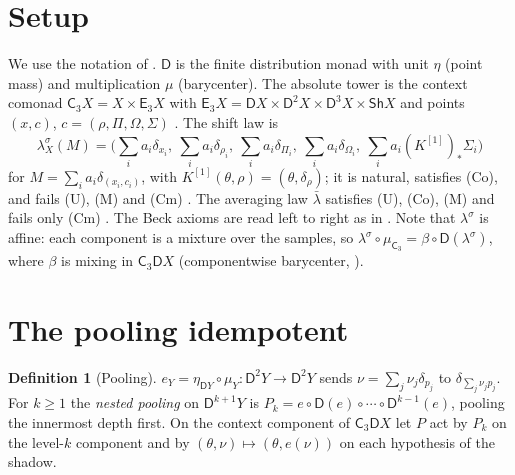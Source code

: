 \documentclass[11pt]{article}
\theoremstyle{definition}
\newtheorem{definition}[theorem]{Definition}
\newcommand{\D}{\mathsf D}
\newcommand{\C}{\mathsf C}
\newcommand{\E}{\mathsf E}
\newcommand{\Sh}{\mathsf{Sh}}
\newcommand{\ls}{\lambda^{\sigma}}
\newcommand{\lb}{\bar\lambda}
\begin{document}
\section{Setup}
We use the notation of \cite{Tower}. $\D$ is the finite distribution monad with unit $\eta$ (point mass) and multiplication $\mu$
(barycenter). The absolute tower is the context comonad $\C_3X=X\times\E_3X$ with $\E_3X=\D X\times\D^2X\times\D^3X\times\Sh X$ and
points $(x,c)$, $c=(\rho,\Pi,\Omega,\Sigma)$ \cite[Thm.~6.1, Cor.~6.4]{Tower}. The shift law is
\[
\ls_X(M)=\Big(\sum_ia_i\delta_{x_i},\ \sum_ia_i\delta_{\rho_i},\ \sum_ia_i\delta_{\Pi_i},\ \sum_ia_i\delta_{\Omega_i},\ \sum_ia_i(K^{[1]})_*\Sigma_i\Big)
\]
for $M=\sum_ia_i\delta_{(x_i,c_i)}$, with $K^{[1]}(\theta,\rho)=(\theta,\delta_\rho)$; it is natural, satisfies (Co), and fails (U), (M) and
(Cm) \cite[Thm.~8.3]{Tower}. The averaging law $\lb$ satisfies (U), (Co), (M) and fails only (Cm) \cite[Thms.~8.6, 8.7]{Tower}. The Beck
axioms are read left to right as in \cite[Def.~2.1]{Tower}. Note that $\ls$ is affine: each component is a mixture over the samples, so
$\ls\circ\mu_{\C_3}=\beta\circ\D(\ls)$, where $\beta$ is mixing in $\C_3\D X$ (componentwise barycenter, \cite[\S8]{Tower}).

\section{The pooling idempotent}
\begin{definition}[Pooling]\label{def:e}
$e_Y=\eta_{\D Y}\circ\mu_Y\colon\D^2Y\to\D^2Y$ sends $\nu=\sum_j\nu_j\delta_{p_j}$ to $\delta_{\sum_j\nu_jp_j}$. For $k\ge1$ the \emph{nested pooling}
on $\D^{k+1}Y$ is $P_k=e\circ\D(e)\circ\cdots\circ\D^{k-1}(e)$, pooling the innermost depth first. On the context component of $\C_3\D X$ let
$P$ act by $P_k$ on the level-$k$ component and by $(\theta,\nu)\mapsto(\theta,e(\nu))$ on each hypothesis of the shadow.
\end{definition}
\end{document}
